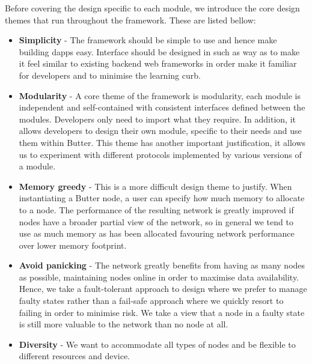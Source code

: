 Before covering the design specific to each module, we introduce the core design themes that run throughout the framework. These are listed bellow:

\begin{itemize}
    \item \textbf{Simplicity} - The framework should be simple to use and hence make building dapps easy. Interface should be designed in such as way as to make it feel similar to existing backend web frameworks in order make it familiar for developers and to minimise the learning curb.
    \item \textbf{Modularity} - A core theme of the framework is modularity, each module is independent and self-contained with consistent interfaces defined between the modules. Developers only need to import what they require. In addition, it allows developers to design their own module, specific to their needs and use them within Butter. This theme has another important justification, it allows us to experiment with different protocols implemented by various versions of a module.
    \item \textbf{Memory greedy} - This is a more difficult design theme to justify. When instantiating a Butter node, a user can specify how much memory to allocate to a node. The performance of the resulting network is greatly improved if nodes have a broader partial view of the network, so in general we tend to use as much memory as has been allocated favouring network performance over lower memory footprint.
    \item \textbf{Avoid panicking} - The network greatly benefits from having as many nodes as possible, maintaining nodes online in order to maximise data availability. Hence, we take a fault-tolerant approach to design where we prefer to manage faulty states rather than a fail-safe approach where we quickly resort to failing in order to minimise risk. We take a view that a node in a faulty state is still more valuable to the network than no node at all.
    \item \textbf{Diversity} - We want to accommodate all types of nodes and be flexible to different resources and device.
\end{itemize}

